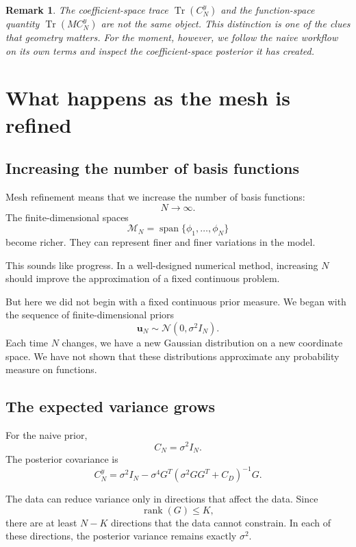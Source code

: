 \documentclass[11pt,a4paper]{book}
\newtheorem{remark}[definition]{Remark}
\newcommand{\M}{\mathcal{M}}      %
\begin{document}
\begin{remark}
The coefficient-space trace $\operatorname{Tr}(C_N^y)$ and the
function-space quantity $\operatorname{Tr}(M C_N^y)$ are not the same object.
This distinction is one of the clues that geometry matters. For the moment,
however, we follow the naive workflow on its own terms and inspect the
coefficient-space posterior it has created.
\end{remark}

\section{What happens as the mesh is refined}

\subsection{Increasing the number of basis functions}

Mesh refinement means that we increase the number of basis functions:
\[
    N \to \infty.
\]
The finite-dimensional spaces
\[
    \M_N
    =
    \operatorname{span}\{\phi_1,\ldots,\phi_N\}
\]
become richer. They can represent finer and finer variations in the model.

This sounds like progress. In a well-designed numerical method, increasing $N$
should improve the approximation of a fixed continuous problem.

But here we did not begin with a fixed continuous prior measure. We began with
the sequence of finite-dimensional priors
\[
    \bm{u}_N \sim \mathcal{N}(0,\sigma^2 I_N).
\]
Each time $N$ changes, we have a new Gaussian distribution on a new coordinate
space. We have not shown that these distributions approximate any probability
measure on functions.

\subsection{The expected variance grows}

For the naive prior,
\[
    C_N = \sigma^2 I_N.
\]
The posterior covariance is
\[
    C_N^y
    =
    \sigma^2 I_N
    -
    \sigma^4 G^T
    \left(
        \sigma^2 GG^T + C_D
    \right)^{-1}
    G.
\]

The data can reduce variance only in directions that affect the data. Since
\[
    \operatorname{rank}(G) \leq K,
\]
there are at least $N-K$ directions that the data cannot constrain. In each of
these directions, the posterior variance remains exactly $\sigma^2$.
\end{document}
